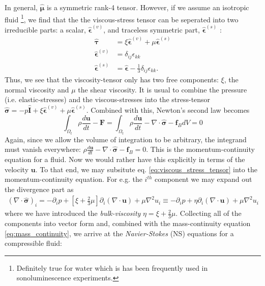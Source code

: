 \documentclass[rmp,aps,nofootinbib,superscriptaddress,floatfix,10pt]{revtex4-2}
\begin{document}
In general, $\hat{\bm{\mu}}$ is a symmetric rank-4 tensor. However, if we assume an isotropic fluid \footnote{Definitely true for water which is has been frequently used in sonoluminescence experiments.}, we find that the the viscous-stress tensor can be seperated into two irreducible parts: a scalar, $\hat{\bm{\epsilon}}^{(v)}$, and traceless symmetric part, $\hat{\bm{\epsilon}}^{(s)}$ \cite{zee2016group,landau1987fluid}:
\begin{equation}
\begin{split}
    \hat{\bm{\tau}} & = \xi \hat{\bm{\epsilon}}^{(v)}+\mu \hat{\bm{\epsilon}}^{(s)} \\
    \hat{\bm{\epsilon}}^{(v)} & = \delta_{ij}\epsilon_{kk} \\
    \hat{\bm{\epsilon}}^{(s)} & = \hat{\bm{\epsilon}}-\frac{1}{3}\delta_{ij}\epsilon_{kk}.
    \label{eq:viscous_stress_tensor}
\end{split}
\end{equation}
Thus, we see that the viscosity-tensor only has two free components: $\xi$, the normal viscosity and $\mu$ the shear viscosity. It is usual to combine the pressure (i.e. elastic-stresses) and the viscous-stresses into the stress-tensor $\hat{\bm{\sigma}}=-p\hat{\bm{I}}+\xi \hat{\bm{\epsilon}}^{(v)}+\mu \hat{\bm{\epsilon}}^{(s)}$. Combined with this, Newton's second law becomes
\begin{equation}
    \int_{\Omega_t} \rho \frac{d \bm{u}}{dt}-\bm{F} = \int_{\Omega_t} \rho \frac{d \bm{u}}{dt} - \nabla \cdot \hat{\bm{\sigma}}-\bm{f}_B dV = 0
\end{equation}
Again, since we allow the volume of integration to be arbitrary, the integrand must vanish everywhere: $\rho \frac{d \bm{u}}{dt} - \nabla \cdot \hat{\bm{\sigma}}-\bm{f}_B=0$. This is the momentum-continuity equation for a fluid. Now we would rather have this explicitly in terms of the velocity $\bm{u}$. To that end, we may subsitute eq. \ref{eq:viscous_stress_tensor} into the momentum-continuity equation. For e.g. the $i^{th}$ component we may expand out the divergence part as 
\begin{equation}
\begin{split}
    \left(\nabla \cdot \hat{\bm{\sigma}}\right)_i = -\partial_i p + \left[\xi +\frac{2}{3}\mu \right] \partial_i(\nabla \cdot \bm{u})+\mu \nabla^2 u_i \equiv -\partial_i p + \eta \partial_i(\nabla \cdot \bm{u})+\mu \nabla^2 u_i
\end{split}
\end{equation}
where we have introduced the \emph{bulk-viscosity} $\eta=\xi+\frac{2}{3}\mu$. Collecting all of the components into vector form and, combined with the mass-continuity equation \ref{eq:mass_continuity}, we arrive at the \emph{Navier-Stokes} (NS) equations for a compressible fluid:
\end{document}
